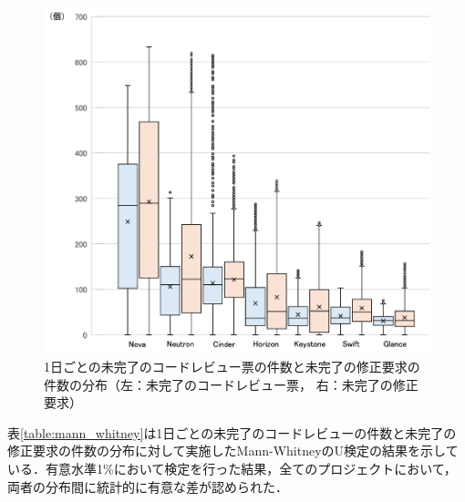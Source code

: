 \documentclass[11pt]{jreport}
\begin{document}
\begin{table}[t]
\centering
  \caption{定義毎に修正要求（239,286件）と紐づいた割合}
  \label{table:link_ratio}
\end{table}

\begin{figure}[t]
\centerline{\includegraphics[width=0.9\linewidth]{@BSthesis2024_Kawasaki/BSthesis2024_Kawasaki_fig/task_distribution.pdf}}
\caption{1日ごとの未完了のコードレビュー票の件数と未完了の修正要求の件数の分布（左：未完了のコードレビュー票， 右：未完了の修正要求）}
\label{fig:task_distribution}
\end{figure}

表\ref{table:mann_whitney}は1日ごとの未完了のコードレビューの件数と未完了の修正要求の件数の分布に対して実施したMann-WhitneyのU検定の結果を示している．有意水準1\%において検定を行った結果，全てのプロジェクトにおいて，両者の分布間に統計的に有意な差が認められた．
\end{document}
